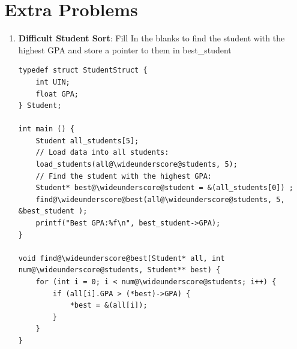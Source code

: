 \documentclass{article}
\begin{document}
\section{Extra Problems}
\begin{enumerate}[label=(\alph*)]
\item \textbf{Difficult Student Sort}: Fill In the blanks to find the student with the highest GPA and store a pointer to them in best\_student
\begin{lstlisting}[style=CStyle] 
typedef struct StudentStruct {
    int UIN;
    float GPA;
} Student;

int main () {
    Student all_students[5];
    // Load data into all students:
    load_students(all@\wideunderscore@students, 5);
    // Find the student with the highest GPA:
    Student* best@\wideunderscore@student = &(all_students[0]) ;
    find@\wideunderscore@best(all@\wideunderscore@students, 5, &best_student );
    printf("Best GPA:%f\n", best_student->GPA);
}

void find@\wideunderscore@best(Student* all, int num@\wideunderscore@students, Student** best) {
    for (int i = 0; i < num@\wideunderscore@students; i++) {
        if (all[i].GPA > (*best)->GPA) {
            *best = &(all[i]);
        }
    }
}

\end{lstlisting}
\begin{lstlisting}[style=CStyle]
\end{lstlisting}


\end{enumerate}
\end{document}
